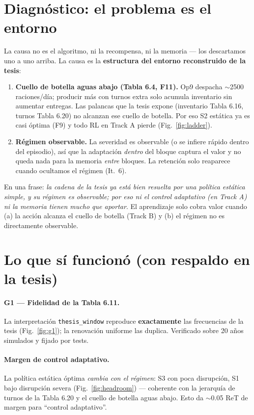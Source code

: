 \documentclass[11pt,a4paper]{article}
\newcommand{\good}[1]{\textcolor{green!45!black}{\textbf{#1}}}
\begin{document}
\section{Diagnóstico: el problema es el entorno}
La causa no es el algoritmo, ni la recompensa, ni la memoria --- los descartamos uno a
uno arriba. La causa es la \textbf{estructura del entorno reconstruido de la tesis}:
\begin{enumerate}
  \item \textbf{Cuello de botella aguas abajo (Tabla 6.4, F11).} Op9 despacha
  $\sim$2500 raciones/día; producir más con turnos extra solo acumula inventario sin
  aumentar entregas. Las palancas que la tesis expone (inventario Tabla 6.16, turnos
  Tabla 6.20) no alcanzan ese cuello de botella. Por eso S2 estática ya es casi óptima
  (F9) y todo RL en Track A pierde (Fig.\ \ref{fig:ladder}).
  \item \textbf{Régimen observable.} La severidad es observable (o se infiere rápido
  dentro del episodio), así que la adaptación \emph{dentro} del bloque captura el valor
  y no queda nada para la memoria \emph{entre} bloques. La retención solo reaparece
  cuando ocultamos el régimen (It.\ 6).
\end{enumerate}
En una frase: \emph{la cadena de la tesis ya está bien resuelta por una política
estática simple, y su régimen es observable; por eso ni el control adaptativo (en Track
A) ni la memoria tienen mucho que aportar}. El aprendizaje solo cobra valor cuando (a)
la acción alcanza el cuello de botella (Track B) y (b) el régimen no es directamente
observable.

\section{Lo que sí funcionó \good{(con respaldo en la tesis)}}
\label{sec:g1}
\paragraph{G1 --- Fidelidad de la Tabla 6.11.} La interpretación \texttt{thesis\_window}
reproduce \good{exactamente} las frecuencias de la tesis (Fig.\ \ref{fig:g1}); la
renovación uniforme las duplica. Verificado sobre 20 años simulados y fijado por tests.
\paragraph{Margen de control adaptativo.} La política estática óptima \emph{cambia con el
régimen}: S3 con poca disrupción, S1 bajo disrupción severa (Fig.\ \ref{fig:headroom}) ---
coherente con la jerarquía de turnos de la Tabla 6.20 y el cuello de botella aguas abajo.
Esto da $\sim$0.05 ReT de margen para ``control adaptativo''.
\end{document}
